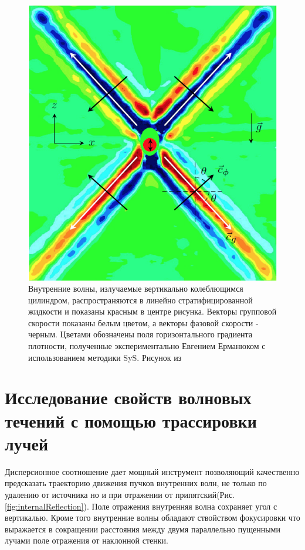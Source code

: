 \begin{figure}
    \centering
    \includegraphics[scale=0.5]{Figs/Experement_Erm.png}
    \caption{Внутренние волны, излучаемые вертикально колеблющимся цилиндром, распространяются в линейно стратифицированной жидкости и  показаны красным в центре рисунка. Векторы групповой скорости показаны белым цветом, а векторы фазовой скорости - черным. Цветами обозначены поля горизонтального градиента плотности, полученные экспериментально Евгением Ерманюком с использованием методики SyS. Рисунок из \cite{brouzet:tel-01361201}}
    \label{fig:ermExp}
\end{figure}



\section{Исследование свойств волновых течений с помощью трассировки лучей}

Дисперсионное соотношение дает мощный инструмент позволяющий качественно предсказать траекторию движения пучков внутренних волн, не только по удалению от источника но и при отражении от припятский(Рис. \ref{fig:internalReflection}). Поле отражения внутренняя волна сохраняет угол с вертикалью. Кроме того внутренние волны обладают ствойством фокусировки что выражается в сокращении расстояния между двумя параллельно пущенными лучами поле отражения от наклонной стенки. 

